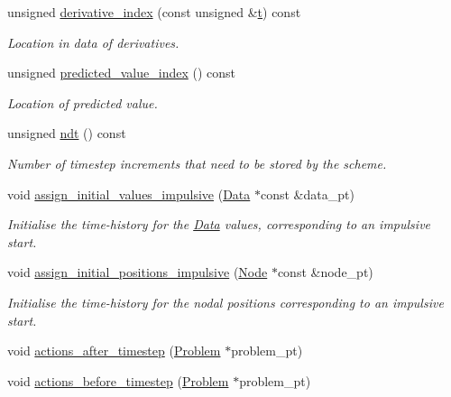 \begin{DoxyCompactItemize}
unsigned \hyperlink{classoomph_1_1TR_abe6ad058fc43a89a8e06f671688d438e}{derivative\+\_\+index} (const unsigned \&\hyperlink{cfortran_8h_af6f0bd3dc13317f895c91323c25c2b8f}{t}) const
\begin{DoxyCompactList}\small\item\em Location in data of derivatives. \end{DoxyCompactList}\item 
unsigned \hyperlink{classoomph_1_1TR_a4416216c3319f42bd7805e136326f8f8}{predicted\+\_\+value\+\_\+index} () const
\begin{DoxyCompactList}\small\item\em Location of predicted value. \end{DoxyCompactList}\item 
unsigned \hyperlink{classoomph_1_1TR_ac41d1d10629140a3a18da92701d3b5a5}{ndt} () const
\begin{DoxyCompactList}\small\item\em Number of timestep increments that need to be stored by the scheme. \end{DoxyCompactList}\item 
void \hyperlink{classoomph_1_1TR_aa73845654866b5cf65ee801f67baa6b3}{assign\+\_\+initial\+\_\+values\+\_\+impulsive} (\hyperlink{classoomph_1_1Data}{Data} $\ast$const \&data\+\_\+pt)
\begin{DoxyCompactList}\small\item\em Initialise the time-\/history for the \hyperlink{classoomph_1_1Data}{Data} values, corresponding to an impulsive start. \end{DoxyCompactList}\item 
void \hyperlink{classoomph_1_1TR_a46878c5cd5b9d20afb2f5d9ab7a7df26}{assign\+\_\+initial\+\_\+positions\+\_\+impulsive} (\hyperlink{classoomph_1_1Node}{Node} $\ast$const \&node\+\_\+pt)
\begin{DoxyCompactList}\small\item\em Initialise the time-\/history for the nodal positions corresponding to an impulsive start. \end{DoxyCompactList}\item 
void \hyperlink{classoomph_1_1TR_ae6a606637401e9ed5ca030fa7b28d89a}{actions\+\_\+after\+\_\+timestep} (\hyperlink{classoomph_1_1Problem}{Problem} $\ast$problem\+\_\+pt)
\item 
void \hyperlink{classoomph_1_1TR_aa8ba8454bc4fcc3ad3c95550663df388}{actions\+\_\+before\+\_\+timestep} (\hyperlink{classoomph_1_1Problem}{Problem} $\ast$problem\+\_\+pt)

\end{DoxyCompactItemize}
